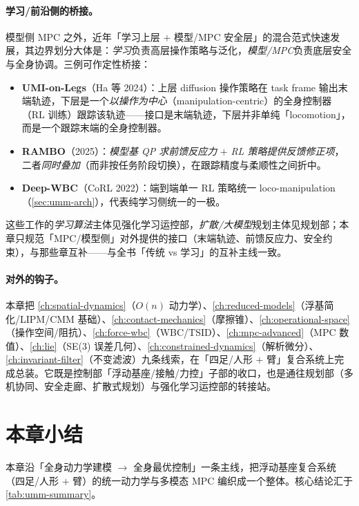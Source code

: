 \paragraph{学习/前沿侧的桥接。}
模型侧 MPC 之外，近年「学习上层 $+$ 模型/MPC 安全层」的混合范式快速发展，其边界划分大体是：\emph{学习}负责高层操作策略与泛化，\emph{模型/MPC}负责底层安全与全身协调。三例可作定性桥接：
\begin{itemize}
  \item \textbf{UMI-on-Legs}（Ha 等 2024）：上层 diffusion 操作策略在 task frame 输出末端轨迹，下层是一个\emph{以操作为中心}（manipulation-centric）的全身控制器（RL 训练）跟踪该轨迹——接口是末端轨迹，下层并非单纯「locomotion」，而是一个跟踪末端的全身控制器\cite{ha2024umi}。
  \item \textbf{RAMBO}（2025）：\emph{模型基 QP 求前馈反应力} $+$ \emph{RL 策略提供反馈修正项}，二者\emph{同时叠加}（而非按任务阶段切换），在跟踪精度与柔顺性之间折中\cite{rambo2025}。
  \item \textbf{Deep-WBC}（CoRL 2022）：端到端单一 RL 策略统一 loco-manipulation（\cref{sec:umm-arch}），代表纯学习侧统一的一极\cite{fu2022deep}。
\end{itemize}
这些工作的\emph{学习算法}主体见强化学习运控部，\emph{扩散/大模型}规划主体见规划部；本章只规范「MPC/模型侧」对外提供的接口（末端轨迹、前馈反应力、安全约束），与那些章互补——与全书「传统 vs 学习」的互补主线一致。

\paragraph{对外的钩子。}
本章把 \cref{ch:spatial-dynamics}（$O(n)$ 动力学）、\cref{ch:reduced-models}（浮基简化/LIPM/CMM 基础）、\cref{ch:contact-mechanics}（摩擦锥）、\cref{ch:operational-space}（操作空间/阻抗）、\cref{ch:force-wbc}（WBC/TSID）、\cref{ch:mpc-advanced}（MPC 数值）、\cref{ch:lie}（SE(3) 误差几何）、\cref{ch:constrained-dynamics}（解析微分）、\cref{ch:invariant-filter}（不变滤波）九条线索，在「四足/人形 $+$ 臂」复合系统上完成总装。它既是控制部「浮动基座/接触/力控」子部的收口，也是通往规划部（多机协同、安全走廊、扩散式规划）与强化学习运控部的转接站。

\section*{本章小结}

本章沿「全身动力学建模 $\to$ 全身最优控制」一条主线，把浮动基座复合系统（四足/人形 $+$ 臂）的统一动力学与多模态 MPC 编织成一个整体。核心结论汇于 \cref{tab:umm-summary}。

